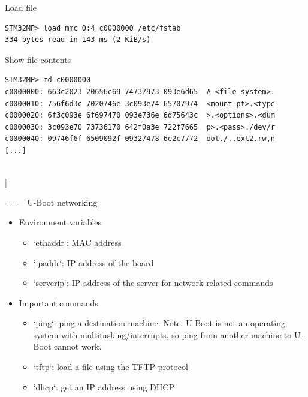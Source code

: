     \begin{block}{Load file}
      {\tiny
\begin{verbatim}
STM32MP> load mmc 0:4 c0000000 /etc/fstab
334 bytes read in 143 ms (2 KiB/s)
\end{verbatim}
      }
    \end{block}

    \begin{block}{Show file contents}
      {\tiny
\begin{verbatim}
STM32MP> md c0000000
c0000000: 663c2023 20656c69 74737973 093e6d65  # <file system>.
c0000010: 756f6d3c 7020746e 3c093e74 65707974  <mount pt>.<type c0000020: 6f3c093e 6f697470 093e736e 6d75643c  >.<options>.<dum c0000030: 3c093e70 73736170 642f0a3e 722f7665  p>.<pass>./dev/r c0000040: 09746f6f 6509092f 09327478 6e2c7772  oot./..ext2.rw,n
[...]
\end{verbatim}
      }
    \end{block}
  \\]


=== {U-Boot networking}
  \begin{itemize}
  \item Environment variables
    \begin{itemize}
    \item `ethaddr`: MAC address
    \item `ipaddr`: IP address of the board
    \item `serverip`: IP address of the server for network related commands
    \end{itemize}
  \item Important commands
    \begin{itemize}
    \item `ping`: ping a destination machine. Note: U-Boot is not
      an operating system with multitasking/interrupts, so ping from
      another machine to U-Boot cannot work.
    \item `tftp`: load a file using the TFTP protocol
    \item `dhcp`: get an IP address using DHCP
    \end{itemize}
  \end{itemize}


